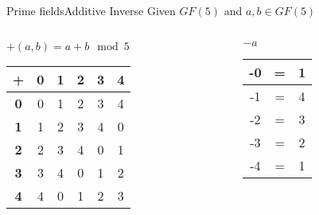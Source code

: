 \begin{frame}[t]{Prime fields}{Additive Inverse}
	Given $GF(5)$ and $a, b \in GF(5)$
	\medskip
	
	\begin{columns}
		\begin{column}{0.5\textwidth}
			\centering $+(a, b) = a + b \mod 5$				
			\begin{table}[]
				\begin{tabular}{c|ccccc}
					\textbf{+} & \textbf{0} & \textbf{1} & \textbf{2} & \textbf{3} & \textbf{4} \\ \hline
					\textbf{0} & 0          & 1          & 2          & 3          & 4          \\
					\textbf{1} & 1          & 2          & 3          & 4          & 0          \\
					\textbf{2} & 2          & 3          & 4          & 0          & 1          \\
					\textbf{3} & 3          & 4          & 0          & 1          & 2          \\
					\textbf{4} & 4          & 0          & 1          & 2          & 3         
				\end{tabular}
			\end{table}
		\end{column}
		\begin{column}{0.5\textwidth}  %
			\centering $-a$		
			\begin{table}[]
				\begin{tabular}{c|cc}
					-0  & = & 1 \\ \hline
					-1 & = & 4 \\
					-2  & = & 3 \\
					-3  & = & 2 \\
					-4  & = & 1
				\end{tabular}
			\end{table}
		\end{column}
	\end{columns}
\end{frame}

